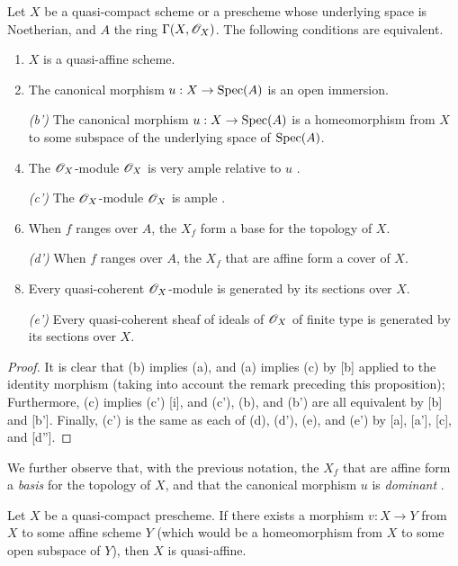 \begin{prop}[5.1.2]
\label{2.5.1.2}
Let $X$ be a quasi-compact scheme or a prescheme whose underlying space is Noetherian, and $A$ the ring $\Gamma(X,\mathscr{O}_X)$.
The following conditions are equivalent.
\begin{enumerate}[label=\emph{(\alph*)}]
  \item $X$ is a quasi-affine scheme.
  \item The canonical morphism $u:X\to\Spec(A)$ is an open immersion.
  \item[\emph{(b')}] The canonical morphism $u:X\to\Spec(A)$ is a homeomorphism from $X$ to some subspace of the underlying space of ${\mathop{\mathrm{Spec}}\nolimits}(A)$.
  \item The $\mathscr{O}_X$-module $\mathscr{O}_X$ is very ample relative to $u$ .
  \item[\emph{(c')}] The $\mathscr{O}_X$-module $\mathscr{O}_X$ is ample .
  \item When $f$ ranges over $A$, the $X_f$ form a base for the topology of $X$.
  \item[\emph{(d')}] When $f$ ranges over $A$, the $X_f$ that are affine form a cover of $X$.
  \item Every quasi-coherent $\mathscr{O}_X$-module is generated by its sections over $X$.
  \item[\emph{(e')}] Every quasi-coherent sheaf of ideals of $\mathscr{O}_X$ of finite type is generated by its sections over $X$.
\end{enumerate}
\end{prop}

\begin{proof}
\label{proof-2.5.1.2}
It is clear that (b) implies (a), and (a) implies (c) by [b] applied to the identity morphism (taking into account the remark preceding this proposition);
Furthermore, (c) implies (c') [i], and (c'), (b), and (b') are all equivalent by [b] and [b'].
Finally, (c') is the same as each of (d), (d'), (e), and (e') by [a], [a'], [c], and [d''].
\end{proof}

We further observe that, with the previous notation, the $X_f$ that are affine form a \emph{basis} for the topology of $X$, and that the canonical morphism $u$ is \emph{dominant} .

\begin{cor}[5.1.3]
\label{1.5.1.3}
Let $X$ be a quasi-compact prescheme.
If there exists a morphism $v:X\to Y$ from $X$ to some affine scheme $Y$ (which would be a homeomorphism from $X$ to some open subspace of $Y$), then $X$ is quasi-affine.
\end{cor}

